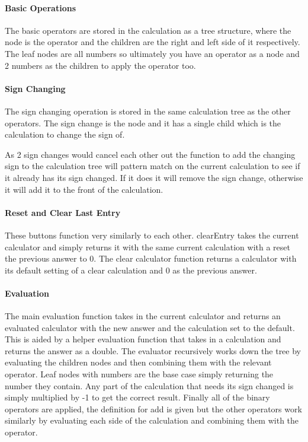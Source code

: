 \documentclass[a4paper]{article}
\begin{document}
\paragraph{Basic Operations}
The basic operators are stored in the calculation as a tree structure, where the node is the operator and the children are the right and left side of it respectively.
The leaf nodes are all numbers so ultimately you have an operator as a node and 2 numbers as the children to apply the operator too.

\paragraph{Sign Changing}
The sign changing operation is stored in the same calculation tree as the other operators.
The sign change is the node and it has a single child which is the calculation to change the sign of.
\par
As 2 sign changes would cancel each other out the function to add the changing sign to the calculation tree will pattern match on the current calculation to see if it already has its sign changed.
If it does it will remove the sign change, otherwise it will add it to the front of the calculation.


\paragraph{Reset and Clear Last Entry}
These buttons function very similarly to each other.
clearEntry takes the current calculator and simply returns it with the same current calculation with a reset the previous answer to 0.
The clear calculator function returns a calculator with its default setting of a clear calculation and 0 as the previous answer.


\paragraph{Evaluation}
The main evaluation function takes in the current calculator and returns an evaluated calculator with the new answer and the calculation set to the default.
This is aided by a helper evaluation function that takes in a calculation and returns the answer as a double.
The evaluator recursively works down the tree by evaluating the children nodes and then combining them with the relevant operator.
Leaf nodes with numbers are the base case simply returning the number they contain.
Any part of the calculation that needs its sign changed is simply multiplied by -1 to get the correct result.
Finally all of the binary operators are applied, the definition for add is given but the other operators work similarly by evaluating each side of the calculation and combining them with the operator.

\end{document}
